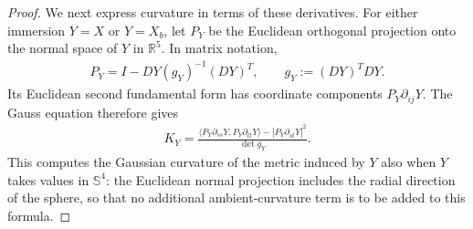 \documentclass[a4paper,11pt,oneside,reqno]{amsart}
\numberwithin{equation}{section}
\theoremstyle{definition}
\begin{document}
\begin{proof}
    We next express curvature in terms of these
    derivatives. For either immersion $Y=X$ or $Y=X_b$,
    let $P_Y$ be the Euclidean orthogonal projection onto
    the normal space of $Y$ in $\mathbb R^5$. In matrix
    notation,
    \begin{align*}
        P_Y=I-DY(g_Y)^{-1}(DY)^T,
        \qquad g_Y:=(DY)^TDY.
    \end{align*}
    Its Euclidean second fundamental form has coordinate
    components $P_Y\partial_{ij}Y$. The Gauss equation
    therefore gives
    \begin{align}
        \label{eq:s4-euclidean-Gauss-comparison}
        K_Y=
        \frac{\langle P_Y\partial_{ss}Y,
                         P_Y\partial_{tt}Y\rangle
        -|P_Y\partial_{st}Y|^2}{\det g_Y}.
    \end{align}
    This computes the Gaussian curvature of the metric
    induced by $Y$ also when $Y$ takes values in
    $\mathbb S^4$: the Euclidean normal projection includes
    the radial direction of the sphere, so that no
    additional ambient-curvature term is to be added to
    this formula.


\end{proof}
\end{document}
